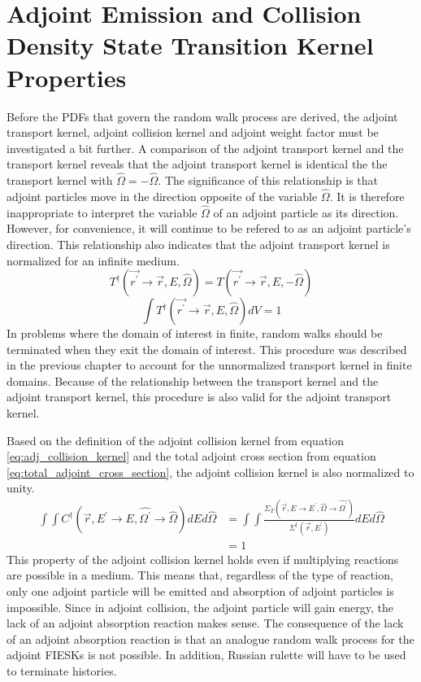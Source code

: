 \section{Adjoint Emission and Collision Density State Transition Kernel Properties}
Before the PDFs that govern the random walk process are derived, the adjoint
transport kernel, adjoint collision kernel and adjoint weight factor must be 
investigated a bit further. A comparison of the adjoint transport kernel and 
the transport kernel reveals that the adjoint transport kernel is identical 
the the transport kernel with $\hat{\Omega} = -\hat{\Omega}$. The significance 
of this relationship is that adjoint particles move in the direction opposite 
of the variable $\hat{\Omega}$. It is therefore inappropriate to interpret the 
variable $\hat{\Omega}$ of an adjoint particle as its direction. However, for 
convenience, it will continue to be refered to as an adjoint particle's 
direction. This relationship also indicates that the adjoint transport kernel
is normalized for an infinite medium.
\begin{equation}
  T^{\dagger}(\vec{r^{'}} \to \vec{r},E,\hat{\Omega}) = 
  T(\vec{r^{'}} \to \vec{r},E,-\hat{\Omega}) 
\end{equation}
\begin{equation}
  \int T^{\dagger}(\vec{r^{'}} \to \vec{r},E,\hat{\Omega}) dV = 1
\end{equation}
In problems where the domain of interest in finite, random walks should be 
terminated when they exit the domain of interest. This procedure was described
in the previous chapter to account for the unnormalized transport kernel in
finite domains. Because of the relationship between the transport kernel and 
the adjoint transport kernel, this procedure is also valid for the adjoint
transport kernel. 

Based on the definition of the adjoint collision kernel from equation
\ref{eq:adj_collision_kernel} and the total adjoint cross section from 
equation \ref{eq:total_adjoint_cross_section}, the adjoint collision kernel is 
also normalized to unity. 
\begin{align}
  \int\int C^{\dagger}(\vec{r},E^{'} \to E,\hat{\Omega^{'}} \to \hat{\Omega})
  dE d\hat{\Omega} & = \int\int 
  \frac{\Sigma_T(\vec{r},E \to E^{'},\hat{\Omega} \to \hat{\Omega^{'}})} 
       {\Sigma^{\dagger}(\vec{r},E^{'})} dEd\hat{\Omega} \nonumber \\
  & = 1 \nonumber 
\end{align}
This property of the adjoint collision kernel holds even if multiplying
reactions are possible in a medium. This means that, regardless of the
type of reaction, only one adjoint particle will be emitted and absorption of
adjoint particles is impossible. Since in adjoint collision, the adjoint
particle will gain energy, the lack of an adjoint absorption reaction makes
sense. The consequence of the lack of an adjoint absorption reaction is that
an analogue random walk process for the adjoint FIESKs is not possible. In
addition, Russian rulette will have to be used to terminate histories.        

